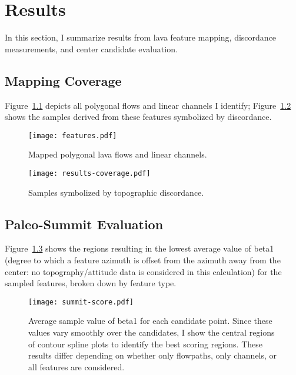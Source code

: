 \chapter{Results}\label{cha:results}

In this section, I summarize results from lava feature mapping, discordance measurements, and center candidate evaluation. 

\section{Mapping Coverage}

Figure~\ref{fig:features} depicts all polygonal flows and linear channels I identify; Figure~\ref{fig:results-coverage} shows the samples derived from these features symbolized by discordance.

\begin{figure}
    \texttt{[image: features.pdf]}%
    \caption[Mapped lava features]{Mapped polygonal lava flows and linear channels.}%
    \label{fig:features}
\end{figure}

\begin{figure}
    \texttt{[image: results-coverage.pdf]}%
    \caption[Mapped topographic discordance]{Samples symbolized by topographic discordance.}%
    \label{fig:results-coverage}
\end{figure}

\section{Paleo-Summit Evaluation}

Figure~\ref{fig:summit-score} shows the regions resulting in the lowest average value of \acs{beta1} (degree to which a feature azimuth is offset from the azimuth away from the center: no topography/attitude data is considered in this calculation) for the sampled features, broken down by feature type.

\begin{figure}
    \texttt{[image: summit-score.pdf]}%
    \caption[Paleo-summit evaluation]{Average sample value of \acs{beta1} for each candidate point. Since these values vary smoothly over the candidates, I show the central regions of contour spline plots to identify the best scoring regions. These results differ depending on whether only flowpaths, only channels, or all features are considered.}%
    \label{fig:summit-score}
\end{figure}

